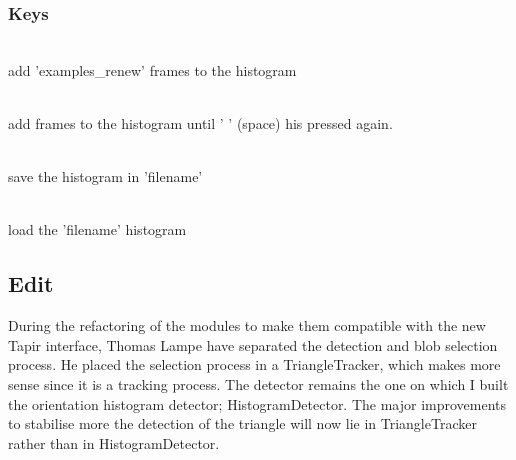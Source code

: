 \subsubsection{Keys}
\label{sec:ohd:howto:keys}
    \begin{description} \itemindent=-15pt
        \item['+'] \hfill \\ add 'examples\_renew' frames to the histogram
        \item[' ' (space)] \hfill \\ add frames to the histogram until ' ' (space) his pressed again.
        \item['s'] \hfill \\ save the histogram in 'filename'
        \item['l'] \hfill \\ load the 'filename' histogram
    \end{description}

\subsection{Edit}
\label{sec:ohd:edit}
During the refactoring of the modules to make them compatible with the 
new Tapir interface, Thomas Lampe have separated the detection and blob 
selection process. He placed the selection process in a TriangleTracker, 
which makes more sense since it is a tracking process. The detector 
remains the one on which I built the orientation histogram detector; 
HistogramDetector. The major improvements to stabilise more the detection 
of the triangle will now lie in TriangleTracker rather than in 
HistogramDetector.
